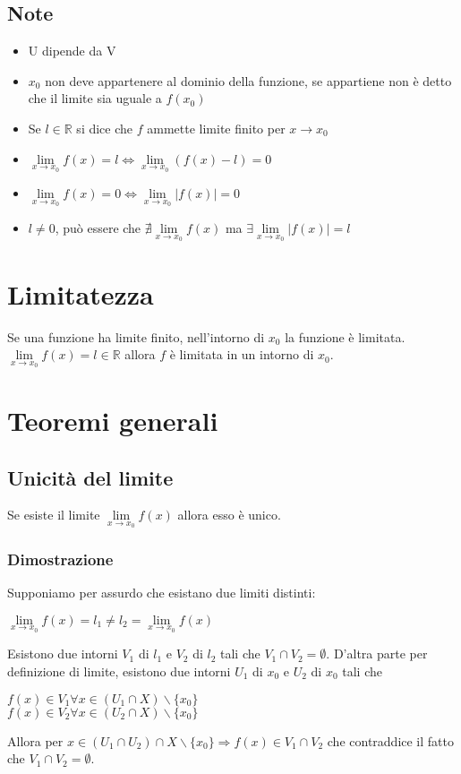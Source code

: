 \subsection{Note}
\begin{itemize}
\item U dipende da V
\item $x_0$ non deve appartenere al dominio della funzione, se appartiene non \`e detto che il limite sia uguale a $f(x_0)$
\item Se $l\in\mathbb{R}$ si dice che $f$ ammette limite finito per $x\rightarrow x_0$
\item $\lim\limits_{x\rightarrow x_0} f(x)=l\Leftrightarrow \lim\limits_{x\rightarrow x_0} (f(x)-l)=0$
\item $\lim\limits_{x\rightarrow x_0} f(x)=0 \Leftrightarrow\lim\limits_{x\rightarrow x_0} |f(x)|=0$
\item $l\neq 0$, pu\`o essere che $\nexists\lim\limits_{x\rightarrow x_0} f(x)$ ma $\exists \lim\limits_{x\rightarrow x_0} |f(x)|=l$
\end{itemize}
\section{Limitatezza}
Se una funzione ha limite finito, nell'intorno di $x_0$ la funzione \`e limitata.\\
$\lim\limits_{x\rightarrow x_0} f(x)=l\in\mathbb{R}$ allora $f$ \`e limitata in un intorno di $x_0$. 

\section{Teoremi generali}
\subsection{Unicit\`a del limite}
Se esiste il limite $\lim\limits_{x\rightarrow x_0} f(x)$ allora esso \`e unico.\\
\subsubsection{Dimostrazione}
Supponiamo per assurdo che esistano due limiti distinti:
\begin{center}
$\lim\limits_{x\rightarrow x_0} f(x)=l_1\neq l_2=\lim\limits_{x\rightarrow x_0} f(x)$
\end{center}
Esistono due intorni $V_1$ di $l_1$ e $V_2$ di $l_2$ tali che $V_1\cap V_2=\emptyset$. D'altra parte per definizione di limite, esistono due intorni $U_1$ di $x_0$ e $U_2$
di $x_0$  tali che 
\begin{center}
$f(x)\in V_1 \forall x\in (U_1\cap X)\backslash\{x_0\}$\\
$f(x)\in V_2 \forall x\in (U_2\cap X)\backslash\{x_0\}$
\end{center}
Allora per $x\in (U_1\cap U_2)\cap X\backslash\{x_0\}\Rightarrow f(x)\in V_1\cap V_2$ che contraddice il fatto che $V_1\cap V_2=\emptyset$.
